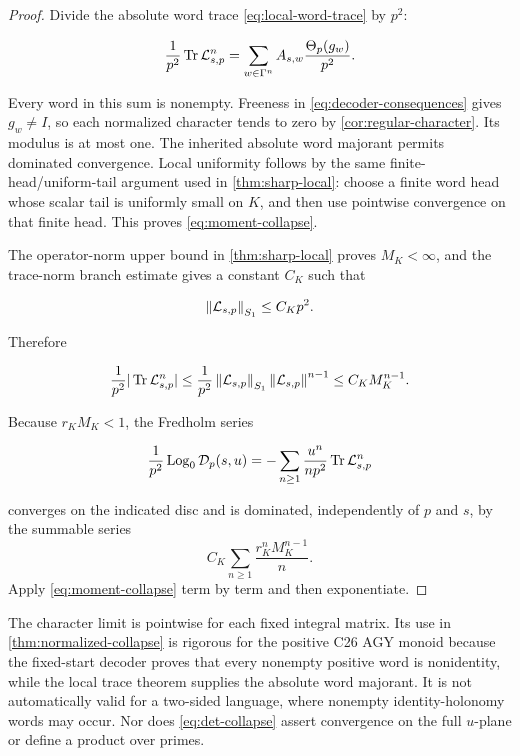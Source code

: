 \begin{proof}
Divide the absolute word trace \cref{eq:local-word-trace} by \(p^2\):

\begin{equation}
 \frac1{p^2}\operatorname{Tr}\mathcal L_{s,p}^n
 =\sum_{w\in\Gamma^n}A_{s,w}
   \frac{\Theta_p(g_w)}{p^2}.
 \label{eq:normalized-word-sum}
\end{equation}

Every word in this sum is nonempty.  Freeness in
\cref{eq:decoder-consequences} gives \(g_w\ne I\), so each normalized
character tends to zero by \cref{cor:regular-character}.  Its modulus is at
most one.  The inherited absolute word majorant permits dominated
convergence.  Local uniformity follows by the same finite-head/uniform-tail
argument used in \cref{thm:sharp-local}: choose a finite word head whose
scalar tail is uniformly small on \(K\), and then use pointwise convergence
on that finite head.  This proves \cref{eq:moment-collapse}.

The operator-norm upper bound in \cref{thm:sharp-local} proves
\(M_K<\infty\), and the trace-norm branch estimate gives a constant \(C_K\)
such that

\begin{equation}
 \left\lVert\mathcal L_{s,p}\right\rVert_{S_{1}}\le C_Kp^2.
 \label{eq:local-S1-CK}
\end{equation}

Therefore

\begin{equation}
 \frac1{p^2}|\operatorname{Tr}\mathcal L_{s,p}^n|
 \le \frac1{p^2}\left\lVert\mathcal L_{s,p}\right\rVert_{S_{1}}
       \left\lVert\mathcal L_{s,p}\right\rVert^{n-1}
 \le C_KM_K^{n-1}.
 \label{eq:moment-domination}
\end{equation}

Because \(r_KM_K<1\), the Fredholm series

\begin{equation}
 \frac1{p^2}\operatorname{Log}_0\mathcal D_p(s,u)
 =-\sum_{n\ge1}\frac{u^n}{n p^2}\operatorname{Tr}\mathcal L_{s,p}^n
 \label{eq:normalized-log-series}
\end{equation}

converges on the indicated disc and is dominated, independently of \(p\) and
\(s\), by the summable series
\[
 C_K\sum_{n\ge1}\frac{r_K^nM_K^{n-1}}{n}.
\]
Apply \cref{eq:moment-collapse} term by term and then exponentiate.
\end{proof}

\begin{remark}
\label{rem:normalized-scope}
The character limit is pointwise for each fixed integral matrix.  Its use in
\cref{thm:normalized-collapse} is rigorous for the positive C26 AGY monoid
because the fixed-start decoder proves that every nonempty positive word is
nonidentity, while the local trace theorem supplies the absolute word
majorant.  It is not automatically valid for a two-sided language, where
nonempty identity-holonomy words may occur.  Nor does
\cref{eq:det-collapse} assert convergence on the full \(u\)-plane or define
a product over primes.
\end{remark}

